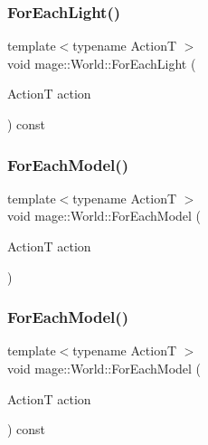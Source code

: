 \hypertarget{classmage_1_1_world_a7f6e04d24be88ae3126021d1b935ef72}{}\label{classmage_1_1_world_a7f6e04d24be88ae3126021d1b935ef72} 
\subsubsection{\texorpdfstring{For\+Each\+Light()}{ForEachLight()}\hspace{0.1cm}{\footnotesize\ttfamily [2/2]}}
{\footnotesize\ttfamily template$<$typename ActionT $>$ \\
void mage\+::\+World\+::\+For\+Each\+Light (\begin{DoxyParamCaption}\item[{ActionT}]{action }\end{DoxyParamCaption}) const}

\hypertarget{classmage_1_1_world_af93e3b8fb6faf403bd375f38323d89be}{}\label{classmage_1_1_world_af93e3b8fb6faf403bd375f38323d89be} 
\subsubsection{\texorpdfstring{For\+Each\+Model()}{ForEachModel()}\hspace{0.1cm}{\footnotesize\ttfamily [1/2]}}
{\footnotesize\ttfamily template$<$typename ActionT $>$ \\
void mage\+::\+World\+::\+For\+Each\+Model (\begin{DoxyParamCaption}\item[{ActionT}]{action }\end{DoxyParamCaption})}

\hypertarget{classmage_1_1_world_a8f9c130a358f6ce687d2948f477d4ef2}{}\label{classmage_1_1_world_a8f9c130a358f6ce687d2948f477d4ef2} 
\subsubsection{\texorpdfstring{For\+Each\+Model()}{ForEachModel()}\hspace{0.1cm}{\footnotesize\ttfamily [2/2]}}
{\footnotesize\ttfamily template$<$typename ActionT $>$ \\
void mage\+::\+World\+::\+For\+Each\+Model (\begin{DoxyParamCaption}\item[{ActionT}]{action }\end{DoxyParamCaption}) const}

